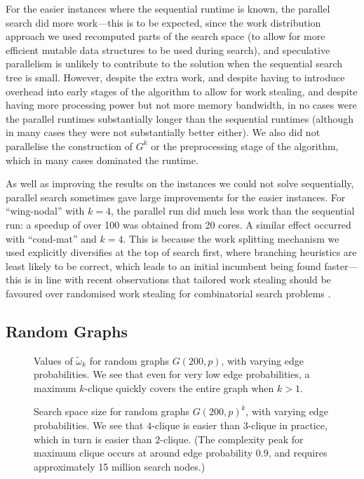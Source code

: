 \documentclass[letterpaper]{article}
\begin{document}
For the easier instances where the sequential runtime is known, the parallel search did more
work---this is to be expected, since the work distribution approach we used recomputed parts of the
search space (to allow for more efficient mutable data structures to be used during search), and
speculative parallelism is unlikely to contribute to the solution when the sequential search tree is
small. However, despite the extra work, and despite having to introduce overhead into early stages
of the algorithm to allow for work stealing, and despite having more processing power but not more
memory bandwidth, in no cases were the parallel runtimes substantially longer than the sequential
runtimes (although in many cases they were not substantially better either). We also did not
parallelise the construction of $G^k$ or the preprocessing stage of the algorithm, which in many
cases dominated the runtime.

As well as improving the results on the instances we could not solve sequentially, parallel search
sometimes gave large improvements for the easier instances. For ``wing-nodal'' with $k=4$, the
parallel run did much less work than the sequential run: a speedup of over 100 was obtained from 20
cores. A similar effect occurred with ``cond-mat'' and $k=4$. This is because the work splitting
mechanism we used explicitly diversifies at the top of search first, where branching heuristics are
least likely to be correct, which leads to an initial incumbent being found faster---this is in line
with recent observations that tailored work stealing should be favoured over randomised work
stealing for combinatorial search problems
\cite{DBLP:conf/cp/ChuSS09,DBLP:journals/topc/McCreeshP15}.

\subsection{Random Graphs}

\begin{figure}[t]
    \centering
    
    \caption{Values of $\tilde{\omega}_k$ for random graphs $G(200, p)$, with varying edge probabilities.
        We see that even for very low edge probabilities, a maximum $k$-clique
    quickly covers the entire graph when $k > 1$.}
    \label{figure:graph-omega}
\end{figure}

\begin{figure}[t]
    \centering
    
    \caption{Search space size for random graphs $G(200, p)^k$, with varying edge probabilities. We see that
        $4$-clique is easier than $3$-clique in practice, which in turn is easier than $2$-clique. (The
        complexity peak for maximum clique occurs at around edge probability 0.9, and requires
        approximately 15 million search nodes.)}
    \label{figure:graph-nodes}
\end{figure}
\end{document}
